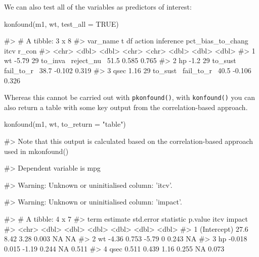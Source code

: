 We can also test all of the variables as predictors of interest:

\begin{Schunk}
\begin{Sinput}
konfound(m1, wt, test_all = TRUE)
\end{Sinput}
\begin{Soutput}
#> # A tibble: 3 x 8
#>   var_name     t    df action   inference  pct_bias_to_chang~   itcv r_con
#>   <chr>    <dbl> <dbl> <chr>    <chr>                   <dbl>  <dbl> <dbl>
#> 1 wt       -5.79    29 to_inva~ reject_nu~               51.5  0.585 0.765
#> 2 hp       -1.2     29 to_sust~ fail_to_r~               38.7 -0.102 0.319
#> 3 qsec      1.16    29 to_sust~ fail_to_r~               40.5 -0.106 0.326
\end{Soutput}
\end{Schunk}

Whereas this cannot be carried out with \texttt{pkonfound()}, with
\texttt{konfound()} you can also return a table with some key output
from the correlation-based approach.

\begin{Schunk}
\begin{Sinput}
konfound(m1, wt, to_return = "table")
\end{Sinput}
\begin{Soutput}
#> Note that this output is calculated based on the correlation-based approach used in mkonfound()
\end{Soutput}
\begin{Soutput}
#> Dependent variable is mpg
\end{Soutput}
\begin{Soutput}
#> Warning: Unknown or uninitialised column: 'itcv'.
\end{Soutput}
\begin{Soutput}
#> Warning: Unknown or uninitialised column: 'impact'.
\end{Soutput}
\begin{Soutput}
#> # A tibble: 4 x 7
#>   term        estimate std.error statistic p.value   itcv impact
#>   <chr>          <dbl>     <dbl>     <dbl>   <dbl>  <dbl>  <dbl>
#> 1 (Intercept)   27.6       8.42       3.28   0.003 NA     NA    
#> 2 wt            -4.36      0.753     -5.79   0      0.243 NA    
#> 3 hp            -0.018     0.015     -1.19   0.244 NA      0.511
#> 4 qsec           0.511     0.439      1.16   0.255 NA      0.073
\end{Soutput}
\end{Schunk}

